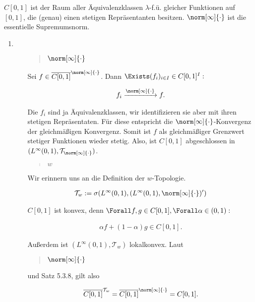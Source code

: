 \begin{solution}

$C[0, 1]$ ist der Raum aller Äquivalenzklassen $\lambda$-f.ü. gleicher Funktionen auf $[0, 1]$, die (genau) einen stetigen Repräsentanten besitzen.
$\norm[\infty]{\cdot}$ ist die essentielle Supremumsnorm.

\begin{enumerate}[label = \alph*)]

  \item
  \phantom{}

  \begin{itemize}

    \item
    [\blockquote{$\norm[\infty]{\cdot}$}:]

    Sei $f \in \overline{C[0, 1]}^{\norm[\infty]{\cdot}}$.
    Dann $\Exists (f_i)_{i \in I} \in C[0, 1]^I:$

    \begin{align*}
      f_i \xrightarrow{\norm[\infty]{\cdot}} f.
    \end{align*}

    Die $f_i$ sind ja Äquivalenzklassen, wir identifizieren sie aber mit ihren stetigen Repräsentaten.
    Für diese entspricht die $\norm[\infty]{\cdot}$-Konvergenz der gleichmäßigen Konvergenz.
    Somit ist $f$ als gleichmäßiger Grenzwert stetiger Funktionen wieder stetig.
    Also, ist $C[0, 1]$ abgeschlossen in $(L^\infty(0, 1), \mathcal{T}_{\norm[\infty]{\cdot}})$.

    \item
    [\blockquote{$w$}:]

    Wir erinnern uns an die Definition der $w$-Topologie.

    \begin{align*}
      \mathcal{T}_w
      :=
      \sigma
      (
        L^\infty(0,1),
        (L^\infty(0,1), \norm[\infty]{\cdot})^\prime
      )
    \end{align*}

    $C[0, 1]$ ist konvex, denn $\Forall f, g \in C[0, 1], \Forall \alpha \in (0, 1):$

    \begin{align*}
      \alpha f + (1 - \alpha) g \in C[0, 1].
    \end{align*}

    Außerdem ist $(L^\infty(0, 1), \mathcal{T}_w)$ lokalkonvex.
    Laut \blockquote{$\norm[\infty]{\cdot}$} und Satz 5.3.8, gilt also

    \begin{align*}
      \overline{C[0,1]}^{\mathcal{T}_w}
      =
      \overline{C[0,1]}^{\norm[\infty]{\cdot}}
      =
      C[0, 1].
    \end{align*}


\end{itemize}
\end{enumerate}
\end{solution}
